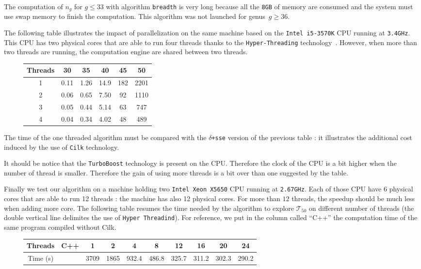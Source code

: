 \documentclass[reqno,11pt]{amsart}
\theoremstyle{plain}
\theoremstyle{definition}
\newcommand{\Cilk}{\texttt{Cilk}\xspace}
\renewcommand{\leq}{\leqslant}
\renewcommand{\geq}{\geqslant}
\renewcommand{\tt}[1]{\texttt{#1}}
\begin{document}
The computation of $n_g$ for $g\leq 33$ with algorithm \texttt{breadth} is very 
long because all the \texttt{8GB} of memory are consumed and the system 
must use swap memory to finish the computation. This algorithm was not launched 
for genus~$g\geq 36$.


The following table illustrates the impact of parallelization on the same 
machine based on the \tt{Intel\texttrademark{} i5-3570K} CPU 
running at \texttt{3.4GHz}. This CPU has two physical cores that are able 
to run four threads thanks to the \texttt{Hyper-Threading} 
technology~\cite{WikipediaHT}. However, when more 
than two threads are running, the computation engine are shared between two 
threads. 
  
  \begin{figure}[h!]
\begin{tabular}{|c|c|c|c|c|c|} 
\hline
Threads & 30 & 35 & 40 & 45 & 50 \\
\hline
1 &  0.11 & 1.26 & 14.9 & 182 & 2201 \\ 
2 &  0.06 & 0.65 & 7.50 &  92 & 1110\\
3 &  0.05 & 0.44 & 5.14 &  63 & 747 \\
4 &  0.04 & 0.34 & 4.02 &  48 & 489 \\
\hline
\end{tabular}
\end{figure}

The time of the one threaded algorithm  must be compared with the 
\texttt{$\delta$+sse} version of the previous table : it illustrates the 
additional cost induced by the use of \Cilk technology. 

It should be notice that the \texttt{TurboBoost} technology \cite{WikipediaTB} 
is present on the CPU. Therefore the clock of the CPU is a bit higher when the 
number of thread 
is smaller. Therefore the gain of using more threads is a bit over than one 
suggested by the table.

Finally we test our algorithm on a machine holding two 
\tt{Intel\texttrademark{} Xeon\texttrademark{} X5650} CPU running 
at \texttt{2.67GHz}.
Each of those CPU have 6 physical cores that are able to run 12 threads : the 
machine has also 12 physical cores.  
For more than $12$ threads, the speedup should be much less when
adding more core. The following table resumes the time needed by the algorithm 
to explore $\mathcal{T}_{50}$ on different number of threads (the double 
vertical line delimites the use of \texttt{Hyper Threadind}). For reference,
we put in the column called ``C++'' the computation time of the same
program compiled without Cilk.
\begin{figure}[h!]
\begin{tabular}{|c|c|c|c|c|c|c||c|c|c|}
\hline
 Threads & C++ & 1 & 2 & 4 & 8 & 12 & 16 & 20 & 24\\
 \hline
 Time (s) &      & 3709 & 1865 & 932.4 & 486.8 & 325.7 & 311.2 & 302.3 & 290.2\\
 \hline
\end{tabular}
\end{figure}
\end{document}
